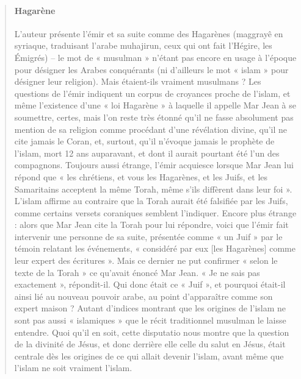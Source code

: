 \begin{quote}
\paragraph{Hagarène} 
L’auteur présente l’émir et sa suite comme des Hagarènes (maggrayê en syriaque, traduisant l’arabe muhajirun, ceux qui ont fait l’Hégire, les Émigrés) – le mot de « musulman » n’étant pas encore en usage à l’époque pour désigner les Arabes conquérants (ni d’ailleurs le mot « islam » pour désigner leur religion). Mais étaient-ils vraiment musulmans ?
Les questions de l’émir indiquent un corpus de croyances proche de l’islam, et même l’existence d’une « loi Hagarène » à laquelle il appelle Mar Jean à se soumettre, certes, mais l’on reste très étonné qu’il ne fasse absolument pas mention de sa religion comme procédant d’une révélation divine, qu’il ne cite jamais le Coran, et, surtout, qu’il n'évoque jamais le prophète de l’islam, mort 12 ans auparavant, et dont il aurait pourtant été l’un des compagnons.
Toujours aussi étrange, l’émir acquiesce lorsque Mar Jean lui répond que « les chrétiens, et vous les Hagarènes, et les Juifs, et les Samaritains acceptent la même Torah, même s’ils diffèrent dans leur foi ». L’islam affirme au contraire que la Torah aurait été falsifiée par les Juifs, comme certains versets coraniques semblent l’indiquer.
Encore plus étrange : alors que Mar Jean cite la Torah pour lui répondre, voici que l’émir fait intervenir une personne de sa suite, présentée comme « un Juif » par le témoin relatant les événements, « considéré par eux [les Hagarènes] comme leur expert des écritures ». Mais ce dernier ne put confirmer « selon le texte de la Torah » ce qu’avait énoncé Mar Jean. « Je ne sais pas exactement », répondit-il. Qui donc était ce « Juif », et pourquoi était-il ainsi lié au nouveau pouvoir arabe, au point d’apparaître comme son expert maison ?
Autant d’indices montrant que les origines de l’islam ne sont pas aussi « islamiques » que le récit traditionnel musulman le laisse entendre. Quoi qu’il en soit, cette disputatio nous montre que la question de la divinité de Jésus, et donc derrière elle celle du salut en Jésus, était centrale dès les origines de ce qui allait devenir l’islam, avant même que l’islam ne soit vraiment l’islam.

 

\end{quote}